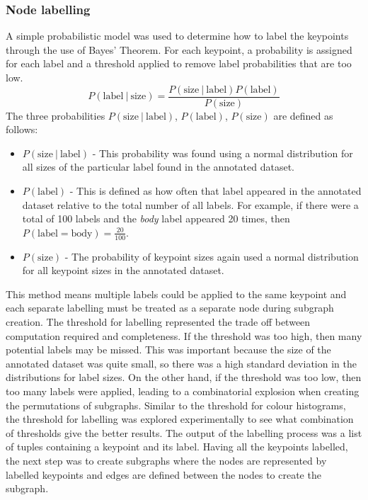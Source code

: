 \subsubsection{Node labelling}\label{sec:probabilistic-model}
A simple probabilistic model was used to determine how to label the keypoints through the use of Bayes' Theorem. For each keypoint, a probability is assigned for each label and a threshold applied to remove label probabilities that are too low.
\begin{equation}\label{eq:bayes-labelling}
P(\text{label}\ |\ \text{size}) = \frac{P(\text{size}\ |\ \text{label}) P(\text{label})} {P(\text{size})}
\end{equation}
The three probabilities $P(\text{size}\ |\ \text{label})$, $P(\text{label})$, $P(\text{size})$ are defined as follows:
\begin{itemize}
\item $P(\text{size}\ |\ \text{label})$ - This probability was found using a normal distribution for all sizes of the particular label found in the annotated dataset.
\item $P(\text{label})$ - This is defined as how often that label appeared in the annotated dataset relative to the total number of all labels. For example, if there were a total of 100 labels and the \textit{body} label appeared 20 times, then $P(\text{label} = \text{body}) = \frac{20}{100}$.
\item $P(\text{size})$ - The probability of keypoint sizes again used a normal distribution for all keypoint sizes in the annotated dataset.
\end{itemize}
This method means multiple labels could be applied to the same keypoint and each separate labelling must be treated as a separate node during subgraph creation. The threshold for labelling represented the trade off between computation required and completeness. If the threshold was too high, then many potential labels may be missed. This was important because the size of the annotated dataset was quite small, so there was a high standard deviation in the distributions for label sizes. On the other hand, if the threshold was too low, then too many labels were applied, leading to a combinatorial explosion when creating the permutations of subgraphs. Similar to the threshold for colour histograms, the threshold for labelling was explored experimentally to see what combination of thresholds give the better results. The output of the labelling process was a list of tuples containing a keypoint and its label. Having all the keypoints labelled, the next step was to create subgraphs where the nodes are represented by labelled keypoints and edges are defined between the nodes to create the subgraph. 


